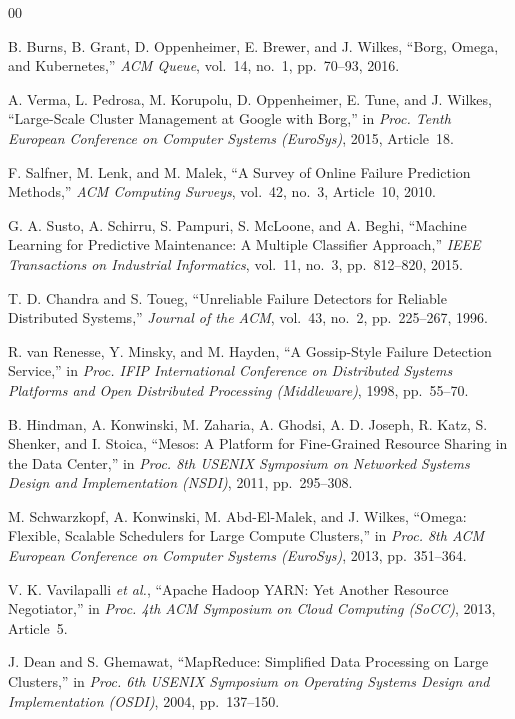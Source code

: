 \documentclass[conference]{IEEEtran}
\begin{document}

\begin{thebibliography}{00}

 B. Burns, B. Grant, D. Oppenheimer, E. Brewer, and J. Wilkes, ``Borg, Omega,
and Kubernetes,'' \emph{ACM Queue}, vol.~14, no.~1, pp.~70--93, 2016.

 A. Verma, L. Pedrosa, M. Korupolu, D. Oppenheimer, E. Tune, and J. Wilkes,
``Large-Scale Cluster Management at Google with Borg,'' in \emph{Proc. Tenth European Conference on
Computer Systems (EuroSys)}, 2015, Article~18.

 F. Salfner, M. Lenk, and M. Malek, ``A Survey of Online Failure
Prediction Methods,'' \emph{ACM Computing Surveys}, vol.~42, no.~3, Article~10, 2010.

 G. A. Susto, A. Schirru, S. Pampuri, S. McLoone, and A. Beghi, ``Machine
Learning for Predictive Maintenance: A Multiple Classifier Approach,'' \emph{IEEE Transactions on
Industrial Informatics}, vol.~11, no.~3, pp.~812--820, 2015.

 T. D. Chandra and S. Toueg, ``Unreliable Failure Detectors for
Reliable Distributed Systems,'' \emph{Journal of the ACM}, vol.~43, no.~2, pp.~225--267, 1996.

 R. van Renesse, Y. Minsky, and M. Hayden, ``A Gossip-Style Failure
Detection Service,'' in \emph{Proc. IFIP International Conference on Distributed Systems Platforms and
Open Distributed Processing (Middleware)}, 1998, pp.~55--70.

 B. Hindman, A. Konwinski, M. Zaharia, A. Ghodsi, A. D. Joseph, R. Katz,
S. Shenker, and I. Stoica, ``Mesos: A Platform for Fine-Grained Resource Sharing in the Data Center,''
in \emph{Proc. 8th USENIX Symposium on Networked Systems Design and Implementation (NSDI)}, 2011,
pp.~295--308.

 M. Schwarzkopf, A. Konwinski, M. Abd-El-Malek, and J. Wilkes, ``Omega:
Flexible, Scalable Schedulers for Large Compute Clusters,'' in \emph{Proc. 8th ACM European Conference
on Computer Systems (EuroSys)}, 2013, pp.~351--364.

 V. K. Vavilapalli \emph{et al.}, ``Apache Hadoop YARN: Yet Another
Resource Negotiator,'' in \emph{Proc. 4th ACM Symposium on Cloud Computing (SoCC)}, 2013, Article~5.

 J. Dean and S. Ghemawat, ``MapReduce: Simplified Data Processing on Large
Clusters,'' in \emph{Proc. 6th USENIX Symposium on Operating Systems Design and Implementation
(OSDI)}, 2004, pp.~137--150.


\end{thebibliography}
\end{document}
